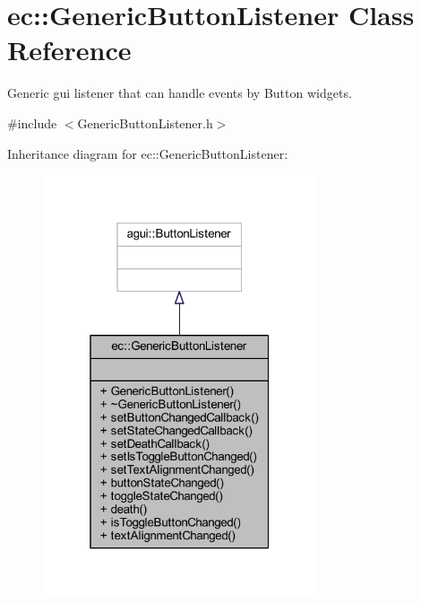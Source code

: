 \hypertarget{classec_1_1_generic_button_listener}{}\section{ec\+:\+:Generic\+Button\+Listener Class Reference}
\label{classec_1_1_generic_button_listener}


Generic gui listener that can handle events by Button widgets.  




{\ttfamily \#include $<$Generic\+Button\+Listener.\+h$>$}



Inheritance diagram for ec\+:\+:Generic\+Button\+Listener\+:\nopagebreak
\begin{figure}[H]
\begin{center}
\leavevmode
\includegraphics[width=229pt]{classec_1_1_generic_button_listener__inherit__graph}
\end{center}
\end{figure}


